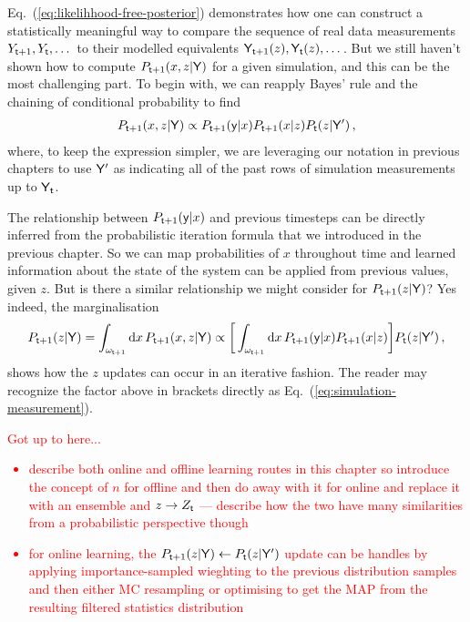 Eq.~(\ref{eq:likelihhood-free-posterior}) demonstrates how one can construct a statistically meaningful way to compare the sequence of real data measurements $Y_{{\sf t}+1}, Y_{{\sf t}}, \dots$ to their modelled equivalents ${\sf Y}_{{\sf t}+1}(z), {\sf Y}_{{\sf t}}(z), \dots$. But we still haven't shown how to compute $P_{{\sf t}+1}(x,z\vert {\sf Y})$ for a given simulation, and this can be the most challenging part. To begin with, we can reapply Bayes' rule and the chaining of conditional probability to find 
\begin{align}
P_{{\sf t}+1}(x,z\vert {\sf Y}) \propto P_{{\sf t}+1}({\sf y}\vert x)P_{{\sf t}+1}(x\vert z)P_{{\sf t}}(z\vert {\sf Y}') \,,
\end{align}
where, to keep the expression simpler, we are leveraging our notation in previous chapters to use ${\sf Y}'$ as indicating all of the past rows of simulation measurements up to ${\sf Y}_{{\sf t}}$. 

The relationship between $P_{{\sf t}+1}({\sf y}\vert x)$ and previous timesteps can be directly inferred from the probabilistic iteration formula that we introduced in the previous chapter. So we can map probabilities of $x$ throughout time and learned information about the state of the system can be applied from previous values, given $z$. But is there a similar relationship we might consider for $P_{{\sf t}+1}(z\vert {\sf Y})$? Yes indeed, the marginalisation
\begin{align} 
P_{{\sf t}+1}(z\vert {\sf Y}) = \int_{\omega_{{\sf t}+1}} {\rm d}x \, P_{{\sf t}+1}(x,z\vert {\sf Y}) \propto \bigg[ \int_{\omega_{{\sf t}+1}} {\rm d}x \, P_{{\sf t}+1}({\sf y}\vert x) P_{{\sf t}+1}(x\vert z) \bigg] P_{{\sf t}}(z\vert {\sf Y}')\,,
\end{align}
shows how the $z$ updates can occur in an iterative fashion. The reader may recognize the factor above in brackets directly as Eq.~(\ref{eq:simulation-measurement}).

\textcolor{red}{Got up to here...
\begin{itemize}
\item{describe both online and offline learning routes in this chapter so introduce the concept of $n$ for offline and then do away with it for online and replace it with an ensemble and $z\rightarrow Z_{{\sf t}}$ --- describe how the two have many similarities from a probabilistic perspective though}
\item{for online learning, the $P_{{\sf t}+1}(z\vert {\sf Y}) \leftarrow P_{{\sf t}}(z\vert {\sf Y}')$ update can be handles by applying importance-sampled wieghting to the previous distribution samples and then either MC resampling or optimising to get the MAP from the resulting filtered statistics distribution}
\end{itemize}}

